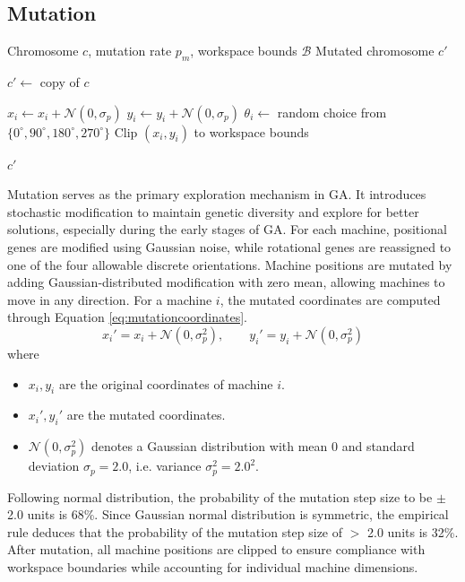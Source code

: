 \documentclass{article}
\begin{document}
\subsection{Mutation}
\begin{algorithm}[H]
\caption{Mutation}
\label{alg:mutation}
\begin{algorithmic}[1]
\Require Chromosome $c$, mutation rate $p_m$, workspace bounds $\mathcal{B}$
\Ensure Mutated chromosome $c'$

\State $c' \gets$ copy of $c$

        \State $x_i \gets x_i + \mathcal{N}(0, \sigma_p)$
        \State $y_i \gets y_i + \mathcal{N}(0, \sigma_p)$
        \State $\theta_i \gets$ random choice from $\{0^\circ,90^\circ,180^\circ,270^\circ\}$
        \State Clip $(x_i,y_i)$ to workspace bounds
    \EndIf
\EndFor

\State \Return $c'$
\end{algorithmic}
\end{algorithm}
Mutation serves as the primary exploration mechanism in GA. It introduces stochastic modification to maintain genetic diversity and explore for better solutions, especially during the early stages of GA. For each machine, positional genes are modified using Gaussian noise, while rotational genes are reassigned to one of the four allowable discrete orientations. Machine positions are mutated by adding Gaussian-distributed modification with zero mean, allowing machines to move in any direction. For a machine $i$, the mutated coordinates are computed through Equation \ref{eq:mutationcoordinates}.
\begin{equation}
x_i' = x_i + \mathcal{N}(0, \sigma_p^2), \qquad
y_i' = y_i + \mathcal{N}(0, \sigma_p^2)
\label{eq:mutationcoordinates}
\end{equation}
where
\begin{itemize}
    \item $x_i, y_i$ are the original coordinates of machine $i$.
    \item $x_i', y_i'$ are the mutated coordinates.
    \item $\mathcal{N}(0, \sigma_p^2)$ denotes a Gaussian distribution with mean $0$ and standard deviation $\sigma_p=2.0$, i.e. variance $\sigma_p^2 = 2.0^2$.
\end{itemize}
Following normal distribution, the probability of the mutation step size to be $\pm$ 2.0 units is 68\%. Since Gaussian normal distribution is symmetric, the empirical rule deduces that the probability of the mutation step size of $>$ 2.0 units is 32\%.
After mutation, all machine positions are clipped to ensure compliance with workspace boundaries while accounting for individual machine dimensions.
\end{document}

